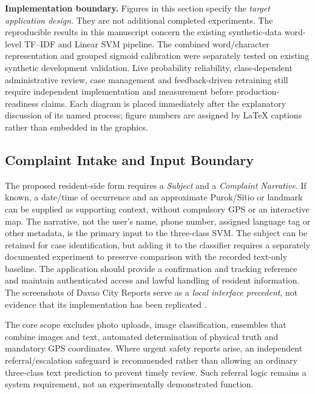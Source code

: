 
\label{sec:proposed-operational-workflows}
\textbf{Implementation boundary.} Figures in this section specify the \emph{target application design}. They are not additional completed experiments. The reproducible results in this manuscript concern the existing synthetic-data word-level TF--IDF and Linear SVM pipeline. The combined word/character representation and grouped sigmoid calibration were separately tested on existing synthetic development validation. Live probability reliability, class-dependent administrative review, case management and feedback-driven retraining still require independent implementation and measurement before production-readiness claims. Each diagram is placed immediately after the explanatory discussion of its named process; figure numbers are assigned by LaTeX captions rather than embedded in the graphics.

\subsection{Complaint Intake and Input Boundary}
The proposed resident-side form requires a \emph{Subject} and a \emph{Complaint Narrative}. If known, a date/time of occurrence and an approximate Purok/Sitio or landmark can be supplied as supporting context, without compulsory GPS or an interactive map. The narrative, not the user's name, phone number, assigned language tag or other metadata, is the primary input to the three-class SVM. The subject can be retained for case identification, but adding it to the classifier requires a separately documented experiment to preserve comparison with the recorded text-only baseline. The application should provide a confirmation and tracking reference and maintain authenticated access and lawful handling of resident information. The screenshots of Davao City Reports serve as a \emph{local interface precedent}, not evidence that its implementation has been replicated \cite{dcr,ra10173}.

The core scope excludes photo uploads, image classification, ensembles that combine images and text, automated determination of physical truth and mandatory GPS coordinates. Where urgent safety reports arise, an independent referral/escalation safeguard is recommended rather than allowing an ordinary three-class text prediction to prevent timely review. Such referral logic remains a system requirement, not an experimentally demonstrated function.

